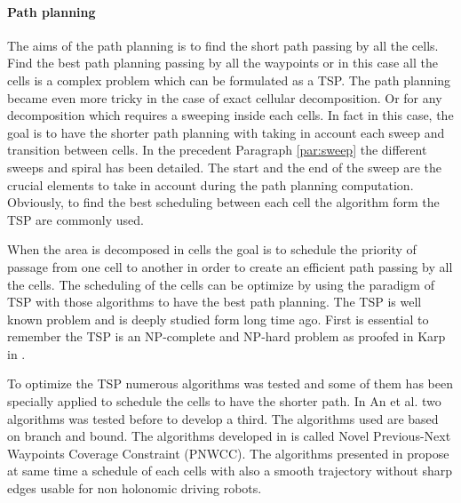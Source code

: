 	
    
 

 
 \paragraph*{Path planning} \label{par:TSPPathPlan}
 
The aims of the path planning is to find the short path passing by all the cells. Find the best path planning passing by all the waypoints or in this case all the cells is a complex problem  which can be formulated as a TSP. The path planning became even more tricky in the case of exact cellular decomposition. Or for any decomposition which requires a sweeping inside each cells. In fact in this case, the goal is to have the shorter path planning with taking in account each sweep and transition between cells. In the precedent Paragraph \ref{par:sweep} the different sweeps and spiral has been detailed. The start and the end of the sweep are the crucial elements to take in account  during the path planning computation.
 Obviously, to find the best scheduling between each cell the algorithm form the TSP are commonly used.     
 
 When the area is decomposed in cells the goal is to schedule the priority of passage from one cell to another in order to create an efficient path passing by all the cells. The scheduling of the cells can be optimize by using the paradigm of TSP with those algorithms to have the best path planning. 
The TSP is well known problem and is deeply studied form long time ago. First is essential  to remember the TSP is an NP-complete and NP-hard problem as proofed in Karp in \cite{236*karp1972}. 

To optimize the TSP numerous algorithms was tested and some of them has been specially applied to schedule the cells to have the shorter path. In  An et al. \cite{60*an2013} two algorithms was tested before to develop a third. The algorithms used are based on branch and bound. The algorithms developed in \cite{60*an2013} is called Novel Previous-Next Waypoints Coverage Constraint (PNWCC). The algorithms presented in \cite{60*an2013} propose at same time a schedule of each cells with also a smooth trajectory without sharp edges usable for non holonomic driving robots. 

